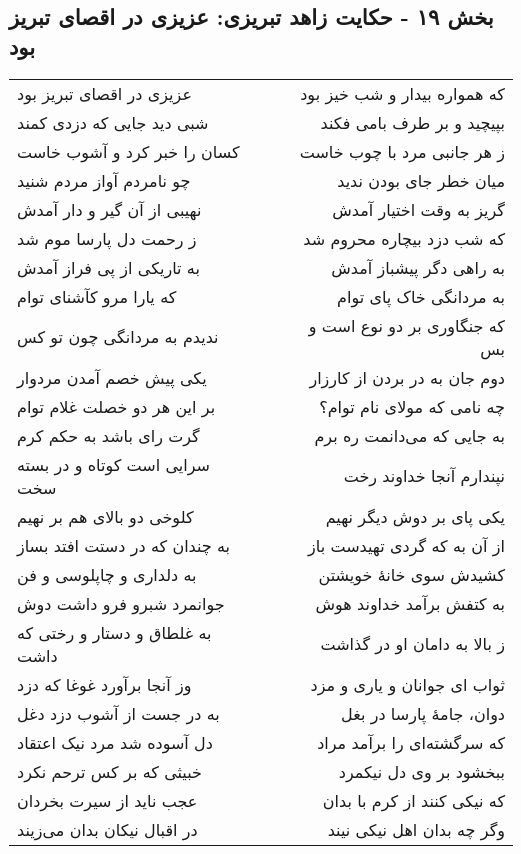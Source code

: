 \begin{center}
\section*{بخش ۱۹ - حکایت زاهد تبریزی: عزیزی در اقصای تبریز بود}
\label{sec:019}
\begin{longtable}{l p{0.5cm} r}
عزیزی در اقصای تبریز بود
&&
که همواره بیدار و شب خیز بود
\\
شبی دید جایی که دزدی کمند
&&
بپیچید و بر طرف بامی فکند
\\
کسان را خبر کرد و آشوب خاست
&&
ز هر جانبی مرد با چوب خاست
\\
چو نامردم آواز مردم شنید
&&
میان خطر جای بودن ندید
\\
نهیبی از آن گیر و دار آمدش
&&
گریز به وقت اختیار آمدش
\\
ز رحمت دل پارسا موم شد
&&
که شب دزد بیچاره محروم شد
\\
به تاریکی از پی فراز آمدش
&&
به راهی دگر پیشباز آمدش
\\
که یارا مرو کآشنای توام
&&
به مردانگی خاک پای توام
\\
ندیدم به مردانگی چون تو کس
&&
که جنگاوری بر دو نوع است و بس
\\
یکی پیش خصم آمدن مردوار
&&
دوم جان به در بردن از کارزار
\\
بر این هر دو خصلت غلام توام
&&
چه نامی که مولای نام توام؟
\\
گرت رای باشد به حکم کرم
&&
به جایی که می‌دانمت ره برم
\\
سرایی است کوتاه و در بسته سخت
&&
نپندارم آنجا خداوند رخت
\\
کلوخی دو بالای هم بر نهیم
&&
یکی پای بر دوش دیگر نهیم
\\
به چندان که در دستت افتد بساز
&&
از آن به که گردی تهیدست باز
\\
به دلداری و چاپلوسی و فن
&&
کشیدش سوی خانهٔ خویشتن
\\
جوانمرد شبرو فرو داشت دوش
&&
به کتفش برآمد خداوند هوش
\\
به غلطاق و دستار و رختی که داشت
&&
ز بالا به دامان او در گذاشت
\\
وز آنجا برآورد غوغا که دزد
&&
ثواب ای جوانان و یاری و مزد
\\
به در جست از آشوب دزد دغل
&&
دوان، جامهٔ پارسا در بغل
\\
دل آسوده شد مرد نیک اعتقاد
&&
که سرگشته‌ای را برآمد مراد
\\
خبیثی که بر کس ترحم نکرد
&&
ببخشود بر وی دل نیکمرد
\\
عجب ناید از سیرت بخردان
&&
که نیکی کنند از کرم با بدان
\\
در اقبال نیکان بدان می‌زیند
&&
وگر چه بدان اهل نیکی نیند
\\
\end{longtable}
\end{center}
